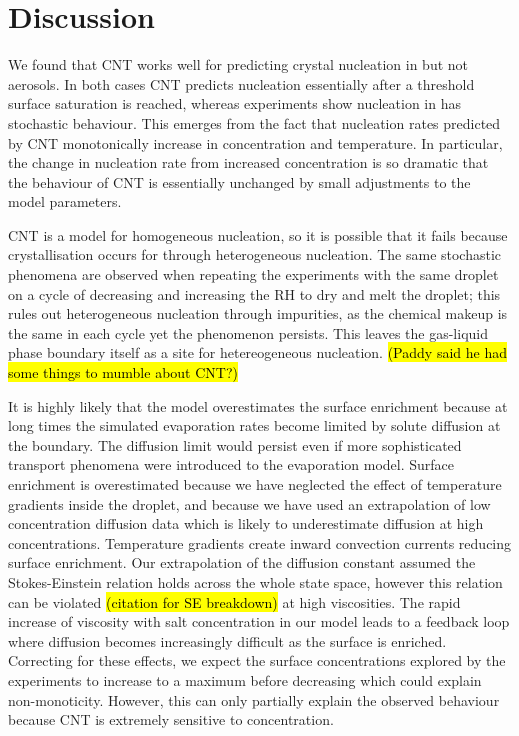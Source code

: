 \documentclass[11pt,twoside]{report}
\begin{document}
\section{Discussion}

We found that CNT works well for predicting crystal nucleation in  but not  aerosols.
In both cases CNT predicts nucleation essentially after a threshold surface saturation is reached, whereas experiments show nucleation in  has stochastic behaviour.
This emerges from the fact that nucleation rates predicted by CNT monotonically increase in concentration and temperature.
In particular, the change in nucleation rate from increased concentration is so dramatic that the behaviour of CNT is essentially unchanged by small adjustments to the model parameters.

CNT is a model for homogeneous nucleation, so it is possible that it fails because crystallisation occurs for  through heterogeneous nucleation.
The same stochastic phenomena are observed when repeating the experiments with the same droplet on a cycle of decreasing and increasing the RH to dry and melt the droplet; this rules out heterogeneous nucleation through impurities, as the chemical makeup is the same in each cycle yet the phenomenon persists.
This leaves the gas-liquid phase boundary itself as a site for hetereogeneous nucleation.
\hl{(Paddy said he had some things to mumble about CNT?)}

It is highly likely that the model overestimates the surface enrichment because at long times the simulated evaporation rates become limited by solute diffusion at the boundary.
The diffusion limit would persist even if more sophisticated transport phenomena were introduced to the evaporation model.
Surface enrichment is overestimated because we have neglected the effect of temperature gradients inside the droplet, and because we have used an extrapolation of low concentration diffusion data which is likely to underestimate diffusion at high concentrations.
Temperature gradients create inward convection currents reducing surface enrichment.
Our extrapolation of the diffusion constant assumed the Stokes-Einstein relation holds across the whole state space, however this relation can be violated \hl{(citation for SE breakdown)} at high viscosities.
The rapid increase of viscosity with salt concentration in our model leads to a feedback loop where diffusion becomes increasingly difficult as the surface is enriched.
Correcting for these effects, we expect the surface concentrations explored by the experiments to increase to a maximum before decreasing which could explain non-monoticity.
However, this can only partially explain the observed behaviour because CNT is extremely sensitive to concentration.
\end{document}
